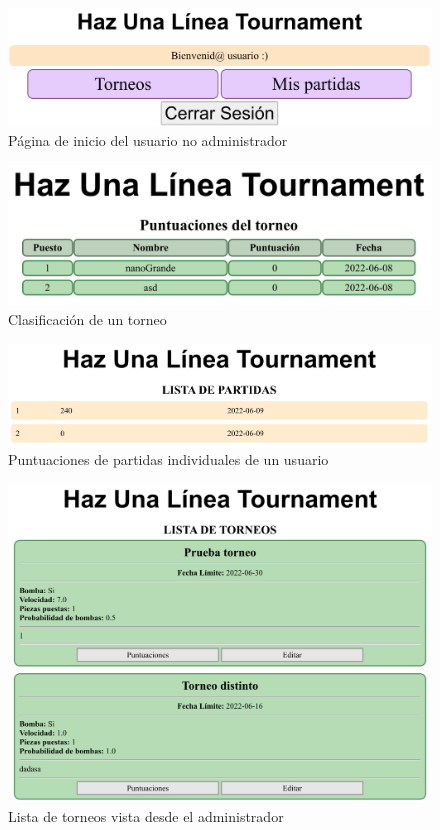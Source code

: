 \documentclass{article}
\begin{document}
\begin{figure}[H]
  \includegraphics[width=\textwidth]{imagenes/inicioUser.png}
  \caption{Página de inicio del usuario no administrador} 
\end{figure}

\begin{figure}[H]
  \includegraphics[width=\textwidth]{imagenes/torneoPuntuacion.png}
  \caption{Clasificación de un torneo} 
\end{figure}

\begin{figure}[H]
  \includegraphics[width=\textwidth]{imagenes/puntuacion.png}
  \caption{Puntuaciones de partidas individuales de un usuario} 
\end{figure}

\begin{figure}[H]
  \includegraphics[width=\textwidth]{imagenes/adminTorneos.png}
  \caption{Lista de torneos vista desde el administrador} 
\end{figure}
\end{document}
